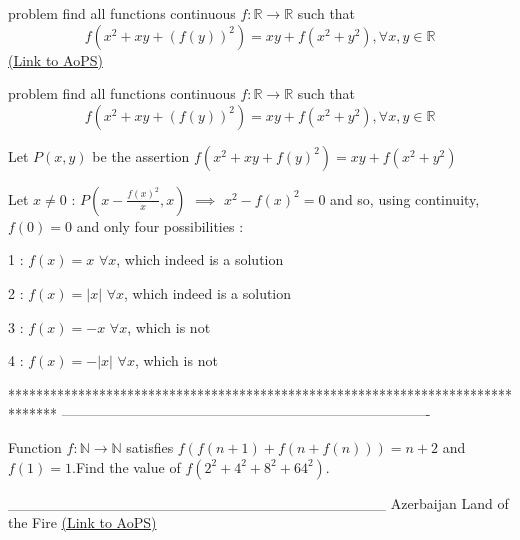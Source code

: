 \begin{problem}
	problem find all functions continuous $f:\mathbb{R}\to\mathbb{R}$ such that 
\[f(x^2 +xy+(f(y))^2)=xy+f(x^2+y^2),\forall x,y\in\mathbb{R}\]
	\flushright \href{https://artofproblemsolving.com/community/c6h528128}{(Link to AoPS)}
\end{problem}



\begin{solution}
	\begin{tcolorbox}problem find all functions continuous $f:\mathbb{R}\to\mathbb{R}$ such that 
\[f(x^2 +xy+(f(y))^2)=xy+f(x^2+y^2),\forall x,y\in\mathbb{R}\]\end{tcolorbox}
Let $P(x,y)$ be the assertion $f(x^2+xy+f(y)^2)=xy+f(x^2+y^2)$

Let $x\ne 0$ : $P(x-\frac{f(x)^2}x,x)$ $\implies$ $x^2-f(x)^2=0$ and so, using continuity, $f(0)=0$ and only four possibilities :

1 : $\boxed{f(x)=x}$ $\forall x$, which indeed is a solution

2 : $\boxed{f(x)=|x|}$ $\forall x$, which indeed is a solution

3 : $f(x)=-x$ $\forall x$, which is not

4 : $f(x)=-|x|$ $\forall x$, which is not
\end{solution}
*******************************************************************************
-------------------------------------------------------------------------------

\begin{problem}
	Function  $f: \mathbb{N}\to\mathbb{N}$  satisfies  $f(f(n+1)+f(n+f(n)))=n+2$ and $f(1)=1$.Find the value of $f(2^2+4^2+8^2+64^2)$.

____________________________________
Azerbaijan Land of the Fire 
	\flushright \href{https://artofproblemsolving.com/community/c6h528325}{(Link to AoPS)}
\end{problem}



